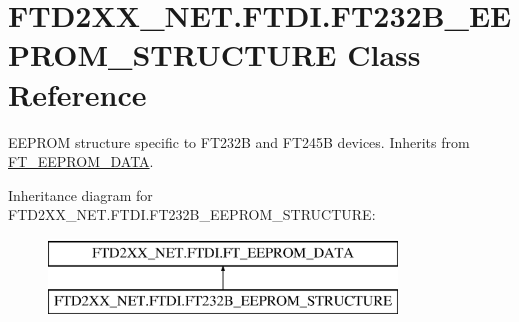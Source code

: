 \hypertarget{class_f_t_d2_x_x___n_e_t_1_1_f_t_d_i_1_1_f_t232_b___e_e_p_r_o_m___s_t_r_u_c_t_u_r_e}{}\section{F\+T\+D2\+X\+X\+\_\+\+N\+E\+T.\+F\+T\+D\+I.\+F\+T232\+B\+\_\+\+E\+E\+P\+R\+O\+M\+\_\+\+S\+T\+R\+U\+C\+T\+U\+RE Class Reference}
\label{class_f_t_d2_x_x___n_e_t_1_1_f_t_d_i_1_1_f_t232_b___e_e_p_r_o_m___s_t_r_u_c_t_u_r_e}


E\+E\+P\+R\+OM structure specific to F\+T232B and F\+T245B devices. Inherits from \mbox{\hyperlink{class_f_t_d2_x_x___n_e_t_1_1_f_t_d_i_1_1_f_t___e_e_p_r_o_m___d_a_t_a}{F\+T\+\_\+\+E\+E\+P\+R\+O\+M\+\_\+\+D\+A\+TA}}.  


Inheritance diagram for F\+T\+D2\+X\+X\+\_\+\+N\+E\+T.\+F\+T\+D\+I.\+F\+T232\+B\+\_\+\+E\+E\+P\+R\+O\+M\+\_\+\+S\+T\+R\+U\+C\+T\+U\+RE\+:\begin{figure}[H]
\begin{center}
\leavevmode
\includegraphics[height=2.000000cm]{class_f_t_d2_x_x___n_e_t_1_1_f_t_d_i_1_1_f_t232_b___e_e_p_r_o_m___s_t_r_u_c_t_u_r_e}
\end{center}
\end{figure}
